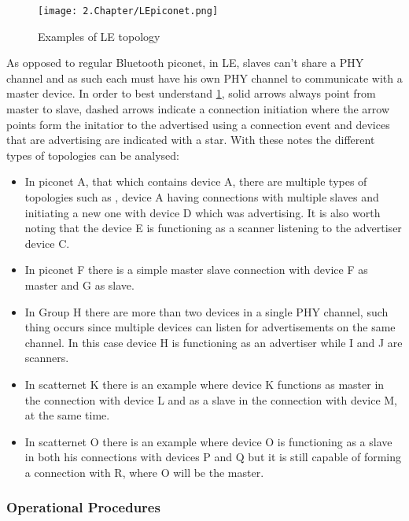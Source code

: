\begin{figure}[H]
	\centering
		\texttt{[image: 2.Chapter/LEpiconet.png]}
	\caption[LE Topology]{Examples of LE topology}
	\label{fig:LEpiconet}
\end{figure}

As opposed to regular Bluetooth piconet, in \ac{LE}, slaves can't share a \ac{PHY} channel and as such each must have his own \ac{PHY} channel to communicate with a master device. In order to best understand \ref{fig:LEpiconet}, solid arrows always point from master to slave, dashed arrows indicate a connection initiation where the arrow points form the initatior to the advertised using a connection event and devices that are advertising are indicated with a star. With these notes the different types of topologies can be analysed:

\begin{itemize}
\item In piconet A, that which contains device A, there are multiple types of topologies such as , device A having connections with multiple slaves and initiating a new one with device D which was advertising. It is also worth noting that the device E is functioning as a scanner listening to the advertiser device C.

\item In piconet F there is a simple master slave connection with device F as master and G as slave.

\item In Group H there are more than two devices in a single \ac{PHY} channel, such thing occurs since multiple devices can listen for advertisements on the same channel. In this case device H is functioning as an advertiser while I and J are scanners.

\item In scatternet K there is an example where device K functions as master in the connection with device L and as a slave in the connection with device M, at the same time.

\item In scatternet O there is an example where device O is functioning as a slave in both his connections with devices P and Q but it is still capable of forming a connection with R, where O will be the master.
\end{itemize}

\subsubsection{Operational Procedures}
\label{subsec:Operational}

